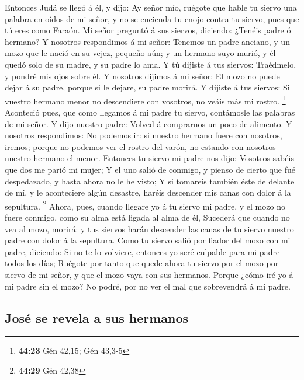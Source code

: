  Entonces Judá se llegó á él, y dijo: Ay señor mío,
ruégote que hable tu siervo una palabra en oídos de mi señor, y no se
encienda tu enojo contra tu siervo, pues que tú eres como Faraón.
 Mi señor preguntó á sus siervos, diciendo: ¿Tenéis padre
ó hermano?  Y nosotros respondimos á mi señor: Tenemos un
padre anciano, y un mozo que le nació en su vejez, pequeño aún; y un
hermano suyo murió, y él quedó solo de su madre, y su padre lo ama.
 Y tú dijiste á tus siervos: Traédmelo, y pondré mis ojos
sobre él.  Y nosotros dijimos á mi señor: El mozo no
puede dejar á su padre, porque si le dejare, su padre morirá.
 Y dijiste á tus siervos: Si vuestro hermano menor no
descendiere con vosotros, no veáis más mi rostro. \footnote{\textbf{44:23}
  Gén 42,15; Gén 43,3-5}  Aconteció pues, que como
llegamos á mi padre tu siervo, contámosle las palabras de mi señor.
 Y dijo nuestro padre: Volved á comprarnos un poco de
alimento.  Y nosotros respondimos: No podemos ir: si
nuestro hermano fuere con nosotros, iremos; porque no podemos ver el
rostro del varón, no estando con nosotros nuestro hermano el menor.
 Entonces tu siervo mi padre nos dijo: Vosotros sabéis
que dos me parió mi mujer;  Y el uno salió de conmigo, y
pienso de cierto que fué despedazado, y hasta ahora no le he visto;
 Y si tomareis también éste de delante de mí, y le
aconteciere algún desastre, haréis descender mis canas con dolor á la
sepultura. \footnote{\textbf{44:29} Gén 42,38}  Ahora,
pues, cuando llegare yo á tu siervo mi padre, y el mozo no fuere
conmigo, como su alma está ligada al alma de él, 
Sucederá que cuando no vea al mozo, morirá: y tus siervos harán
descender las canas de tu siervo nuestro padre con dolor á la sepultura.
 Como tu siervo salió por fiador del mozo con mi padre,
diciendo: Si no te lo volviere, entonces yo seré culpable para mi padre
todos los días;  Ruégote por tanto que quede ahora tu
siervo por el mozo por siervo de mi señor, y que el mozo vaya con sus
hermanos.  Porque ¿cómo iré yo á mi padre sin el mozo? No
podré, por no ver el mal que sobrevendrá á mi padre.

\hypertarget{josuxe9-se-revela-a-sus-hermanos}{%
\subsection{José se revela a sus
hermanos}\label{josuxe9-se-revela-a-sus-hermanos}}


